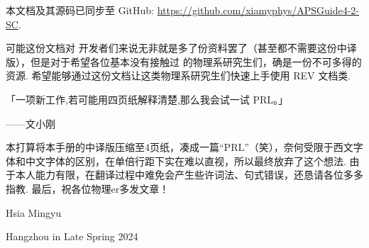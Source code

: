 \documentclass[twocolumn, amssymb, bibnotes, aps, prd, 10pt]{revtex4-2}
\newcommand{\revtex}{REV\hologo{TeX}}
\begin{document}
本文档及其源码已同步至 GitHub:  \url{https://github.com/xiamyphys/APSGuide4-2-SC}.

可能这份文档对 开发者们来说无非就是多了份资料罢了（甚至都不需要这份中译版），但是对于希望各位基本没有接触过 的物理系研究生们，确是一份不可多得的资源. 希望能够通过这份文档让这类物理系研究生们快速上手使用 {\revtex} 文档类.

\begin{center}
    「一项新工作,若可能用四页纸解释清楚,那么我会试一试 PRL。」

    \hfill ——文小刚
\end{center}

本打算将本手册的中译版压缩至4页纸，凑成一篇``PRL''（笑），奈何受限于西文字体和中文字体的区别，在单倍行距下实在难以直视，所以最终放弃了这个想法. 由于本人能力有限，在翻译过程中难免会产生些许词法、句式错误，还恳请各位多多指教. 最后，祝各位物理er多发文章！

\vfill\raggedleft
Hsia Mingyu

Hangzhou in Late Spring 2024
\end{document}
